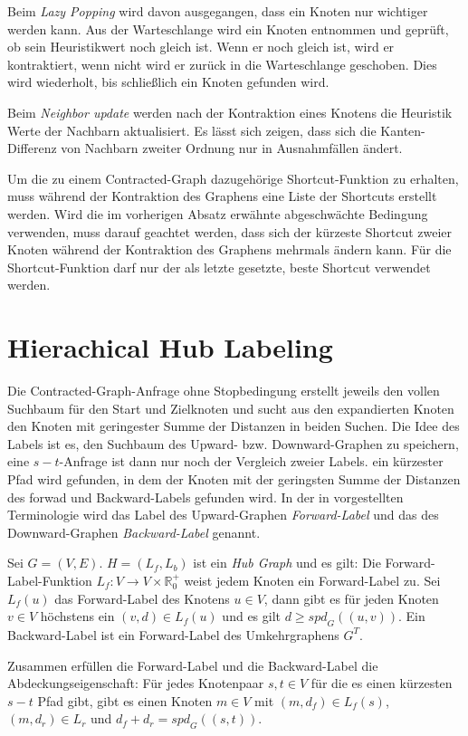 Beim \emph{Lazy Popping} wird davon ausgegangen, dass ein Knoten nur wichtiger werden kann.
Aus der Warteschlange wird ein Knoten entnommen und geprüft, ob sein Heuristikwert noch gleich ist.
Wenn er noch gleich ist, wird er kontraktiert, wenn nicht wird er zurück in die Warteschlange geschoben.
Dies wird wiederholt, bis schließlich ein Knoten gefunden wird.

Beim \emph{Neighbor update} werden nach der Kontraktion eines Knotens die Heuristik Werte der Nachbarn aktualisiert.
Es lässt sich zeigen, dass sich die Kanten-Differenz von Nachbarn zweiter Ordnung nur in Ausnahmfällen ändert.

Um die zu einem Contracted-Graph dazugehörige Shortcut-Funktion zu erhalten, muss während der Kontraktion des Graphens eine Liste der Shortcuts erstellt werden.
Wird die im vorherigen Absatz erwähnte abgeschwächte Bedingung verwenden, muss darauf geachtet werden, dass sich der kürzeste Shortcut zweier Knoten während der Kontraktion des Graphens mehrmals ändern kann.
Für die Shortcut-Funktion darf nur der als letzte gesetzte, beste Shortcut verwendet werden.

\section{Hierachical Hub Labeling}\label{chapter:hl}

Die Contracted-Graph-Anfrage ohne Stopbedingung erstellt jeweils den vollen Suchbaum für den Start und Zielknoten und sucht aus den expandierten Knoten den Knoten mit geringester Summe der Distanzen in beiden Suchen.
Die Idee des Labels ist es, den Suchbaum des Upward- bzw. Downward-Graphen zu speichern, eine $s-t$-Anfrage ist dann nur noch der Vergleich zweier Labels.
ein kürzester Pfad wird gefunden, in dem der Knoten mit der geringsten Summe der Distanzen des forwad und Backward-Labels gefunden wird.
In der in \cite{abraham2011hub} vorgestellten Terminologie wird das Label des Upward-Graphen \emph{Forward-Label} und das des Downward-Graphen \emph{Backward-Label} genannt.

\begin{definition}
    Sei $G = (V, E)$. $H = (L_f, L_b)$ ist ein \emph{Hub Graph} und es gilt:
    Die Forward-Label-Funktion $L_f \colon V \to V \times \mathbb{R}^+_0$ weist jedem Knoten ein Forward-Label zu.
    Sei $L_f (u)$ das Forward-Label des Knotens $u \in V$, dann gibt es für jeden Knoten $v \in V$ höchstens ein $(v, d) \in L_f (u)$ und es gilt $d \geq {spd}_G((u, v))$.
    Ein Backward-Label ist ein Forward-Label des Umkehrgraphens $G^T$.

    Zusammen erfüllen die Forward-Label und die Backward-Label die Abdeckungseigenschaft:
    Für jedes Knotenpaar $s, t \in V$ für die es einen kürzesten $s-t$ Pfad gibt, gibt es einen Knoten $m \in V$ mit $(m, d_f) \in L_f (s)$, $(m, d_r) \in L_r$ und $d_f + d_r = {spd}_G ((s, t))$.
\end{definition}

